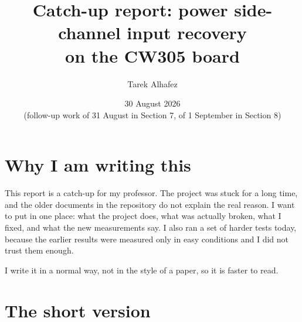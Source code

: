 \documentclass[11pt,a4paper]{article}
\title{\vspace{-1.2cm}\textbf{Catch-up report: power side-channel input recovery\\on the CW305 board}}
\author{Tarek Alhafez}
\date{30 August 2026\\
\small(follow-up work of 31 August in Section 7, of 1 September in Section 8)}
\begin{document}
\maketitle
\vspace{-0.8cm}

\section*{Why I am writing this}

This report is a catch-up for my professor. The project was stuck for a long time, and
the older documents in the repository do not explain the real reason. I want to put in
one place: what the project does, what was actually broken, what I fixed, and what the
new measurements say. I also ran a set of harder tests today, because the earlier
results were measured only in easy conditions and I did not trust them enough.

I write it in a normal way, not in the style of a paper, so it is faster to read.

\section*{The short version}
\end{document}
